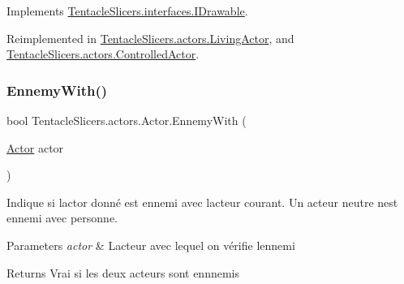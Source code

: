 Implements \hyperlink{interface_tentacle_slicers_1_1interfaces_1_1_i_drawable}{Tentacle\+Slicers.\+interfaces.\+I\+Drawable}.



Reimplemented in \hyperlink{class_tentacle_slicers_1_1actors_1_1_living_actor_a9b8adc982e25895a4509c870f784b5f1}{Tentacle\+Slicers.\+actors.\+Living\+Actor}, and \hyperlink{class_tentacle_slicers_1_1actors_1_1_controlled_actor_a8120affe933e4003bc0866f06589eeac}{Tentacle\+Slicers.\+actors.\+Controlled\+Actor}.

\mbox{\label{class_tentacle_slicers_1_1actors_1_1_actor_acc9e6224adeadcc335d7e3b446080b83}} 
\subsubsection{\texorpdfstring{Ennemy\+With()}{EnnemyWith()}}
{\footnotesize\ttfamily bool Tentacle\+Slicers.\+actors.\+Actor.\+Ennemy\+With (\begin{DoxyParamCaption}\item[{\hyperlink{class_tentacle_slicers_1_1actors_1_1_actor}{Actor}}]{actor }\end{DoxyParamCaption})}



Indique si l\textquotesingle{}actor donné est ennemi avec l\textquotesingle{}acteur courant. Un acteur neutre n\textquotesingle{}est ennemi avec personne. 


\begin{DoxyParams}{Parameters}
{\em actor} & L\textquotesingle{}acteur avec lequel on vérifie l\textquotesingle{}ennemi \\
\hline
\end{DoxyParams}
\begin{DoxyReturn}{Returns}
Vrai si les deux acteurs sont ennnemis 
\end{DoxyReturn}
\mbox{\label{class_tentacle_slicers_1_1actors_1_1_actor_a4f907e69c2500dff893949f57af1d600}} 
